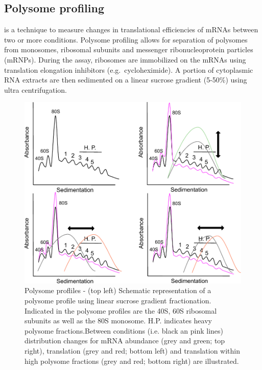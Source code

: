 \documentclass[12pt,openany]{book}
\begin{document}
\clearpage

\subsection{Polysome profiling}

is a technique to measure changes in translational efficiencies of mRNAs
between two or more conditions. Polysome profiling allows for separation
of polysomes from monosomes, ribosomal subunits and messenger
ribonucleoprotein particles (mRNPs). During the assay, ribosomes are
immobilized on the mRNAs using translation elongation inhibitors
(e.g.~cycloheximide). A portion of cytoplasmic RNA extracts are then
sedimented on a linear sucrose gradient (5-50\%) using ultra
centrifugation.

\begin{figure}
    \includegraphics[width=0.9\linewidth]{./figures/polysome_shifts.pdf}
  \caption{Polysome profliles -  (top left) Schematic representation of a polysome profile using linear sucrose gradient fractionation. Indicated in the polysome profiles are the 40S, 60S ribosomal subunits as well as the 80S monosome. H.P. indicates heavy polysome fractions.Between conditions (i.e. black an pink lines) distribution changes for mRNA abundance (grey and green; top right), translation (grey and red; bottom left) and translation within high polysome fractions (grey and red; bottom right) are illustrated. \label{fig:polysome}}
\end{figure}
\end{document}
